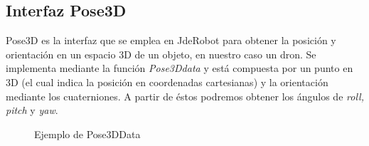 \subsection{Interfaz Pose3D}
\hspace{1cm} Pose3D es la interfaz que se emplea en JdeRobot para obtener la posición y orientación en un espacio 3D de un objeto, en nuestro caso un dron. Se implementa mediante la función \emph{Pose3Ddata} y está compuesta por un punto en 3D (el cual indica la posición en coordenadas cartesianas) y la orientación mediante los cuaterniones. A partir de éstos podremos obtener los ángulos de \textit{roll, pitch} y \textit{yaw}.

\begin{figure}[H]
 \centering
 \caption{Ejemplo de Pose3DData}
 \label{f:Ejemplo de Pose3DData}
\end{figure} 


